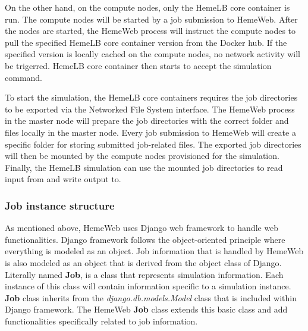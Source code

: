 On the other hand, on the compute nodes, only the HemeLB core container is run. The compute nodes will be started by a job submission to HemeWeb. After the nodes are started, the HemeWeb process will instruct the compute nodes to pull the specified HemeLB core container version from the Docker hub. If the specified version is locally cached on the compute nodes, no network activity will be trigerred. HemeLB core container then starts to accept the simulation command.

To start the simulation, the HemeLB core containers requires the job directories to be exported via the Networked File System interface. The HemeWeb process in the master node will prepare the job directories with the correct folder and files locally in the master node. Every job submission to HemeWeb will create a specific folder for storing submitted job-related files. The exported job directories will then be mounted by the compute nodes provisioned for the simulation. Finally, the HemeLB simulation can use the mounted job directories to read input from and write output to.


\subsubsection{Job instance structure}

As mentioned above, HemeWeb uses Django web framework to handle web functionalities. Django framework follows the object-oriented principle where everything is modeled as an object. Job information that is handled by HemeWeb is also modeled as an object that is derived from the object class of Django. Literally named \textbf{Job}, is a class that represents simulation information. Each instance of this class will contain information specific to a simulation instance. \textbf{Job} class inherits from the \textit{django.db.models.Model} class that is included within Django framework. The HemeWeb \textbf{Job} class extends this basic class and add functionalities specifically related to job information.


